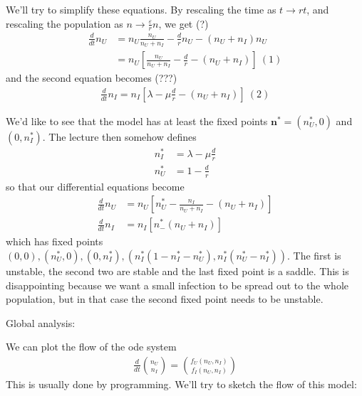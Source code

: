 \documentclass[a4paper]{article}
\begin{document}
We'll try to simplify these equations. By rescaling the time as $t \to rt$, and rescaling the population as $n \to \frac{\varepsilon}{r} n$, we get (?)
\begin{equation*}
\begin{aligned}
\frac{d}{dt} n_U &= n_U \frac{n_U}{n_U + n_I} - \frac{d}{r} n_U - (n_U+n_I) n_U\\
&= n_U\left[\frac{n_U}{n_U+n_I} - \frac{d}{r} - (n_U+n_I)\right] \ (1)
\end{aligned}
\end{equation*}
and the second equation becomes (???)
\begin{equation*}
\begin{aligned}
\frac{d}{dt} n_I = n_I \left[\lambda - \mu \frac{d}{r} - (n_U+n_I)\right] \ (2)
\end{aligned}
\end{equation*}

We'd like to see that the model has at least the fixed points $\mathbf{n}^* = (n^*_U,0)$ and $(0,n^*_I)$. The lecture then somehow defines
\begin{equation*}
\begin{aligned}
n^*_I &= \lambda - \mu \frac{d}{r}\\
n^*_U &= 1-\frac{d}{r}
\end{aligned}
\end{equation*}
so that our differential equations become
\begin{equation*}
\begin{aligned}
\frac{d}{dt} n_U &= n_U \left[n^*_U - \frac{n_I}{n_U+n_I} - (n_U+n_I)\right]\\
\frac{d}{dt} n_I &= n_I \left[n^*_ - (n_U+n_I)\right]
\end{aligned}
\end{equation*}
which has fixed points $(0,0),(n^*_U,0),(0,n^*_I),(n^*_I(1-n^*_I-n^*_U),n^*_I(n^*_U-n^*_I))$. The first is unstable, the second two are stable and the last fixed point is a saddle. This is disappointing because we want a small infection to be spread out to the whole population, but in that case the second fixed point needs to be unstable.

Global analysis:

We can plot the flow of the ode system
\begin{equation*}
\begin{aligned}
\frac{d}{dt} {n_U \choose n_I} = {{f_U(n_U,n_I)} \choose {f_I(n_U,n_I)}}
\end{aligned}
\end{equation*}
This is usually done by programming. We'll try to sketch the flow of this model:
\end{document}
